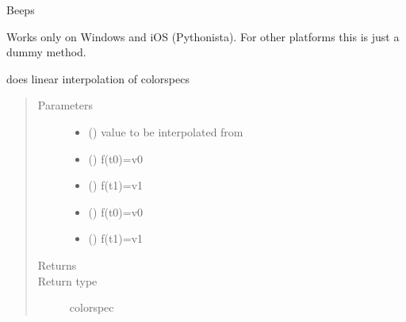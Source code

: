 \documentclass[letterpaper,10pt,english]{sphinxmanual}
\begin{document}
\begin{fulllineitems}
\begin{fulllineitems}
\end{fulllineitems}


\begin{fulllineitems}
\label{\detokenize{Reference:salabim.Environment.beep}}
Beeps

Works only on Windows and iOS (Pythonista). For other platforms this is just a dummy method.

\end{fulllineitems}


\begin{fulllineitems}
\label{\detokenize{Reference:salabim.Environment.colorinterpolate}}
does linear interpolation of colorspecs
\begin{quote}\begin{description}
\item[{Parameters}] \leavevmode\begin{itemize}
\item {} 
 () \textendash{} value to be interpolated from

\item {} 
 () \textendash{} f(t0)=v0

\item {} 
 () \textendash{} f(t1)=v1

\item {} 
 () \textendash{} f(t0)=v0

\item {} 
 () \textendash{} f(t1)=v1

\end{itemize}

\item[{Returns}] \leavevmode
{}

\item[{Return type}] \leavevmode
colorspec


\end{description}
\end{quote}
\end{fulllineitems}
\end{fulllineitems}
\end{document}
